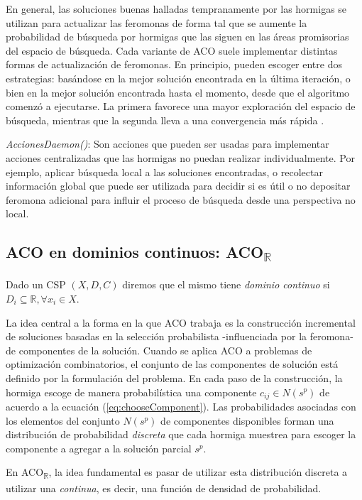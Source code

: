 \documentclass{llncs}
\begin{document}
	En general, las soluciones buenas halladas tempranamente por las hormigas se utilizan para actualizar 
	las feromonas de forma tal que se aumente la probabilidad de búsqueda por hormigas que las siguen
	en las áreas promisorias del espacio de búsqueda. Cada variante de ACO suele implementar distintas formas de 
	actualización de feromonas. En principio, pueden escoger entre dos estrategias: basándose en la mejor solución 
	encontrada en la última iteración, o bien en la mejor solución encontrada hasta el momento, desde que el algoritmo 
	comenzó a ejecutarse. La primera favorece una mayor exploración del espacio de búsqueda, mientras que la segunda 
	lleva a una convergencia más rápida \cite{stu:dor}.
	\bigbreak
	
	\textit{AccionesDaemon()}: Son acciones que pueden ser usadas para implementar acciones centralizadas 
	que las hormigas no puedan realizar individualmente. Por ejemplo, aplicar búsqueda local a las soluciones encontradas, 
	o recolectar información global que puede ser utilizada para decidir si es útil o no depositar feromona adicional para 
	influir el proceso de búsqueda desde una perspectiva no local.

	\subsection{ACO en dominios continuos: ACO\textsubscript{$\mathbb{R}$}}
	\label{subsec:acor}
	Dado un CSP $(X,D,C)$ diremos que el mismo tiene \textit{dominio continuo} si $D_i \subseteq \mathbb{R}, \forall x_i \in X$.
	
	La idea central a la forma en la que ACO trabaja es la construcción incremental de soluciones basadas 
	en la selección probabilista -influenciada por la feromona- de componentes de la solución. Cuando se aplica ACO 
	a problemas de optimización combinatorios, el conjunto de las componentes de solución está definido 
	por la formulación del problema. En cada paso de la construcción, la hormiga escoge de manera probabilística 
	una componente $c_{ij} \in N(s^p)$ de acuerdo a la ecuación (\ref{eq:chooseComponent}). Las probabilidades 
	asociadas con los elementos del conjunto $N(s^p)$ de componentes disponibles  forman una distribución 
	de probabilidad \textit{discreta} que cada hormiga muestrea para escoger la componente a agregar 
	a la solución parcial $s^p$.
	
	En ACO\textsubscript{$\mathbb{R}$}, la idea fundamental es pasar de utilizar esta distribución discreta a utilizar una \textit{continua}, es decir, una función de densidad de probabilidad.
	
\end{document}

